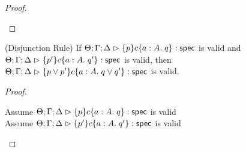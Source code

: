 \begin{proof}
\begin{tabbedproof}
  \end{tabbedproof}
\end{proof}



\begin{lemma}{(Disjunction Rule)}
If $\judgeS{\spec{p}{c}{a:A}{q}}$ is valid and 
   $\judgeS{\spec{p'}{c}{a:A}{q'}}$ is valid, 
then $\judgeS{\spec{p \vee p'}{c}{a:A}{q \vee q'}}$ is valid. 
\end{lemma}

\begin{proof}
  \begin{tabbedproof}
    \oo Assume $\judgeS{\spec{p}{c}{a:A}{q}}$ is valid \\
    \oo Assume $\judgeS{\spec{p'}{c}{a:A}{q'}}$ is valid \\


\end{tabbedproof}
\end{proof}
